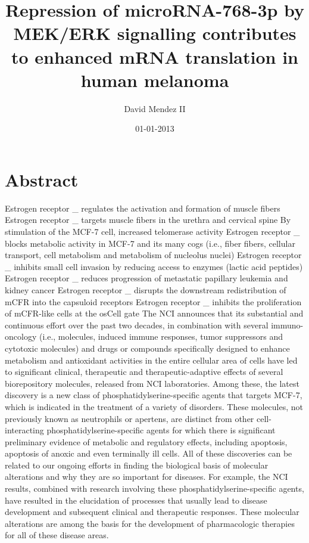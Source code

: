\documentclass{article}%
\title{Repression of microRNA{-}768{-}3p by MEK/ERK signalling contributes to enhanced mRNA translation in human melanoma}%
\author{David Mendez II}%
\affil{Department of Pathology, Yale University School of Medicine, New Haven, CT 06520, USA.}%
\date{01{-}01{-}2013}%
\begin{document}
%
\normalsize%
\maketitle%
\section{Abstract}%
\label{sec:Abstract}%
Estrogen receptor \_ regulates the activation and formation of muscle fibers\newline%
 Estrogen receptor \_ targets muscle fibers in the urethra and cervical spine\newline%
 By stimulation of the MCF{-}7 cell, increased telomerase activity\newline%
 Estrogen receptor \_ blocks metabolic activity in MCF{-}7 and its many cogs (i.e., fiber fibers, cellular transport, cell metabolism and metabolism of nucleolus nuclei)\newline%
 Estrogen receptor \_ inhibits small cell invasion by reducing access to enzymes (lactic acid peptides)\newline%
 Estrogen receptor \_ reduces progression of metastatic papillary leukemia and kidney cancer\newline%
 Estrogen receptor \_ disrupts the downstream redistribution of mCFR into the capsuloid receptors\newline%
 Estrogen receptor \_ inhibits the proliferation of mCFR{-}like cells at the osCell gate\newline%
The NCI announces that its substantial and continuous effort over the past two decades, in combination with several immuno{-}oncology (i.e., molecules, induced immune responses, tumor suppressors and cytotoxic molecules) and drugs or compounds specifically designed to enhance metabolism and antioxidant activities in the entire cellular area of cells have led to significant clinical, therapeutic and therapeutic{-}adaptive effects of several biorepository molecules, released from NCI laboratories. Among these, the latest discovery is a new class of phosphatidylserine{-}specific agents that targets MCF{-}7, which is indicated in the treatment of a variety of disorders. These molecules, not previously known as neutrophils or apertens, are distinct from other cell{-}interacting phosphatidylserine{-}specific agents for which there is significant preliminary evidence of metabolic and regulatory effects, including apoptosis, apoptosis of anoxic and even terminally ill cells.\newline%
All of these discoveries can be related to our ongoing efforts in finding the biological basis of molecular alterations and why they are so important for diseases. For example, the NCI results, combined with research involving these phosphatidylserine{-}specific agents, have resulted in the elucidation of processes that usually lead to disease development and subsequent clinical and therapeutic responses. These molecular alterations are among the basis for the development of pharmacologic therapies for all of these disease areas.\newline%
\end{document}
